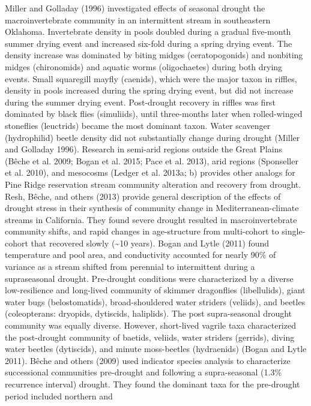 \documentclass[12pt,twoside]{reedthesis}
\theoremstyle{definition}
\theoremstyle{definition}
\theoremstyle{definition}
\theoremstyle{remark}
\begin{document}
Miller and Golladay (1996) investigated effects of seasonal drought the
macroinvertebrate community in an intermittent stream in southeastern
Oklahoma. Invertebrate density in pools doubled during a gradual
five-month summer drying event and increased six-fold during a spring
drying event. The density increase was dominated by biting midges
(ceratopogonids) and nonbiting midges (chironomids) and aquatic worms
(oligochaetes) during both drying events. Small squaregill mayfly
(caenids), which were the major taxon in riffles, density in pools
increased during the spring drying event, but did not increase during
the summer drying event. Post-drought recovery in riffles was first
dominated by black flies (simuliids), until three-months later when
rolled-winged stoneflies (leuctrids) became the most dominant taxon.
Water scavenger (hydrophilid) beetle density did not substantially
change during drought (Miller and Golladay 1996). Research in semi-arid
regions outside the Great Plains (Bêche et al. 2009; Bogan et al. 2015;
Pace et al. 2013), arid regions (Sponseller et al. 2010), and mesocosms
(Ledger et al. 2013a; b) provides other analogs for Pine Ridge
reservation stream community alteration and recovery from drought. Resh,
Bêche, and others (2013) provide general description of the effects of
drought stress in their synthesis of community change in
Mediterranean-climate streams in California. They found severe drought
resulted in macroinvertebrate community shifts, and rapid changes in
age-structure from multi-cohort to single-cohort that recovered slowly
(\textasciitilde{}10 years). Bogan and Lytle (2011) found temperature
and pool area, and conductivity accounted for nearly 90\% of variance as
a stream shifted from perennial to intermittent during a supraseasonal
drought. Pre-drought conditions were characterized by a diverse
low-resilience and long-lived community of skimmer dragonflies
(libellulids), giant water bugs (belostomatids), broad-shouldered water
striders (veliids), and beetles (coleopterans: dryopids, dytiscids,
haliplids). The post supra-seasonal drought community was equally
diverse. However, short-lived vagrile taxa characterized the
post-drought community of baetids, veliids, water striders (gerrids),
diving water beetles (dytiscids), and minute moss-beetles (hydraenids)
(Bogan and Lytle 2011). Bêche and others (2009) used indicator species
analysis to characterize successional communities pre-drought and
following a supra-seasonal (1.3\% recurrence interval) drought. They
found the dominant taxa for the pre-drought period included northern and
\end{document}
